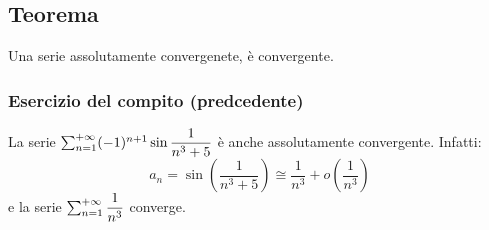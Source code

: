 \documentclass[../main.tex]{subfiles}
\begin{document}
\subsection{Teorema}
Una serie assolutamente convergenete, è convergente.

\subsubsection{Esercizio del compito (predcedente)}
La serie $\sum_{n=1}^{+\infty} (-1)^{n+1}\sin\dfrac{1}{n^3+5}$ è anche assolutamente
convergente. Infatti:
\[
    a_n = \sin \left(\dfrac{1}{n^3+5}\right) \cong \dfrac{1}{n^3} + o\left(\dfrac{1}{n^3}\right)
\]
e la serie $\sum_{n=1}^{+\infty} \dfrac{1}{n^3}$ converge.
\end{document}

